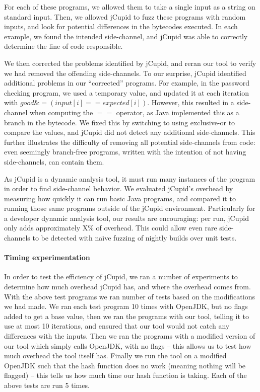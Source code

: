 For each of these programs, we allowed them to take a single input as a string
on standard input. Then, we allowed jCupid to fuzz these programs with random
inputs, and look for potential differences in the bytecodes executed. In each
example, we found the intended side-channel, and jCupid was able to correctly
determine the line of code responsible.

We then corrected the problems identified by jCupid, and reran our tool to
verify we had removed the offending side-channels. To our surprise, jCupid
identified additional problems in our ``corrected'' programs. For example, in
the password checking program, we used a temporary value, and updated it at each
iteration with $ good \&= (input[i] == expected[i]) $. However, this resulted in
a side-channel when computing the $ == $ operator, as Java implemented this as a
branch in the bytecode. We fixed this by switching to using exclusive-or to
compare the values, and jCupid did not detect any additional side-channels. This
further illustrates the difficulty of removing all potential side-channels from
code: even seemingly branch-free programs, written with the intention of not
having side-channels, can contain them.


As jCupid is a dynamic analysis tool, it must run many instances of the program
in order to find side-channel behavior. We evaluated jCupid's overhead by
measuring how quickly it can run basic Java programs, and compared it to running
those same programs outside of the jCupid environment. Particularly for a
developer dynamic analysis tool, our results are encouraging: per run, jCupid
only adds approximately X\% of overhead. This could allow even rare
side-channels to be detected with na\"{\i}ve fuzzing of nightly builds over unit
tests.

\paragraph{Timing experimentation}
In order to test the efficiency of jCupid, we ran a number of experiments to
determine how much overhead jCupid has, and where the overhead comes from.
With the above test programs we ran number of tests based on the modifications
we had made. We ran each test program 10 times with OpenJDK, but no flags added
to get a base value, then we ran the programs with our tool, telling it to use
at most 10 iterations, and ensured that our tool would not catch any differences
with the inputs. Then we ran the programs with a modified version of our tool 
which simply calls OpenJDK, with no flags -- this allows us to test how much 
overhead the tool itself has. Finally we run the tool on a modified OpenJDK such
that the hash function does no work (meaning nothing will be flagged) -- this 
tells us how much time our hash function is taking. Each of the above tests are 
run 5 times.

